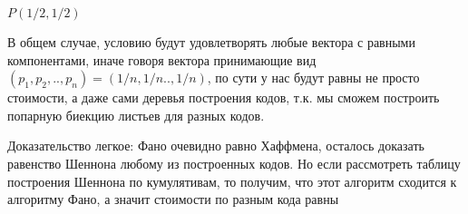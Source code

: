 \documentclass[../main.tex]{subfiles}
\begin{document}
$P(1/2, 1/2)$

В общем случае, условию будут удовлетворять любые вектора с равными компонентами, иначе говоря вектора принимающие вид $(p_1, p_2,.., p_n) = (1/n, 1/n .. , 1/n)$, по сути у нас будут равны не просто стоимости, а даже сами деревья построения кодов, т.к. мы сможем построить попарную биекцию листьев для разных кодов.

Доказательство легкое: Фано очевидно равно Хаффмена, осталось доказать равенство Шеннона любому из построенных кодов. Но если  рассмотреть таблицу построения Шеннона по кумулятивам, то получим, что этот алгоритм сходится к алгоритму Фано, а значит стоимости по разным кода равны
\end{document}
